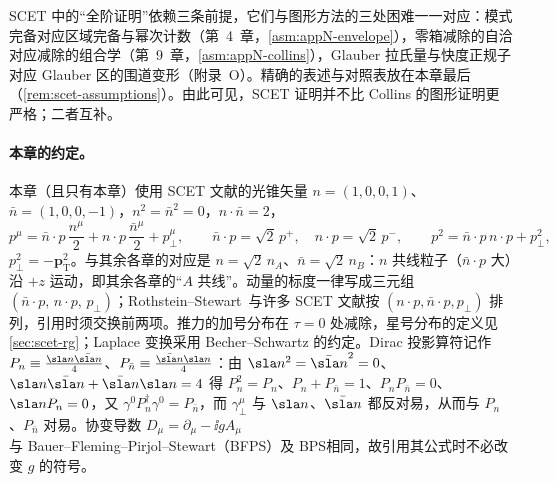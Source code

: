 SCET 中的“全阶证明”依赖三条前提，它们与图形方法的三处困难一一对应：模式完备对应区域完备与幂次计数（第~4~章，\cref{asm:appN-envelope}），零箱减除的自洽对应减除的组合学（第~9~章，\cref{asm:appN-collins}），Glauber 拉氏量与快度正规子对应 Glauber 区的围道变形（附录~O）。精确的表述与对照表放在本章最后（\cref{rem:scet-assumptions}）。由此可见，SCET 证明并不比 Collins 的图形证明更严格；二者互补。

\paragraph{本章的约定。}
本章（且只有本章）使用 SCET 文献的光锥矢量 $n=(1,0,0,1)$、$\bar n=(1,0,0,-1)$，$n^2=\bar n^2=0$，$n\cdot\bar n=2$，
\begin{equation}\label{eq:scet-decomp}
p^\mu=\bar n\cdot p\,\frac{n^\mu}{2}+n\cdot p\,\frac{\bar n^\mu}{2}+p_\perp^\mu,\qquad
\bar n\cdot p=\sqrt2\,p^+,\quad n\cdot p=\sqrt2\,p^-,\qquad p^2=\bar n\cdot p\,n\cdot p+p_\perp^2 ,
\end{equation}
$p_\perp^2=-\bm p_{\mathrm T}^2$。与其余各章的对应是 $n=\sqrt2\,n_A$、$\bar n=\sqrt2\,n_B$：$n$ 共线粒子（$\bar n\cdot p$ 大）沿 $+z$ 运动，即其余各章的“$A$ 共线”。动量的标度一律写成三元组 $(\bar n\cdot p,\,n\cdot p,\,p_\perp)$；Rothstein--Stewart~\cite{RothsteinStewart2016}与许多 SCET 文献按 $(n\cdot p,\bar n\cdot p,p_\perp)$ 排列，引用时须交换前两项。推力的加号分布在 $\tau=0$ 处减除，星号分布的定义见\cref{sec:scet-rg}；Laplace 变换采用 Becher--Schwartz 的约定。Dirac 投影算符记作 $P_n\equiv\frac{\sla n\bar{\sla n}}{4}$、$P_{\bar n}\equiv\frac{\bar{\sla n}\sla n}{4}$：由 $\sla n^2=\bar{\sla n}^2=0$、$\sla n\bar{\sla n}+\bar{\sla n}\sla n=4$ 得 $P_n^2=P_n$、$P_n+P_{\bar n}=1$、$P_nP_{\bar n}=0$、$\sla nP_n=0$，又 $\gamma^0P_n^\dagger\gamma^0=P_{\bar n}$，而 $\gamma_\perp^\mu$ 与 $\sla n$、$\bar{\sla n}$ 都反对易，从而与 $P_n$、$P_{\bar n}$ 对易。协变导数 $D_\mu=\partial_\mu-\ii gA_\mu$ 与 Bauer--Fleming--Pirjol--Stewart（BFPS）\cite{BauerEtAl2001}及 BPS\cite{BauerPirjolStewart2002}相同，故引用其公式时不必改变 $g$ 的符号。
